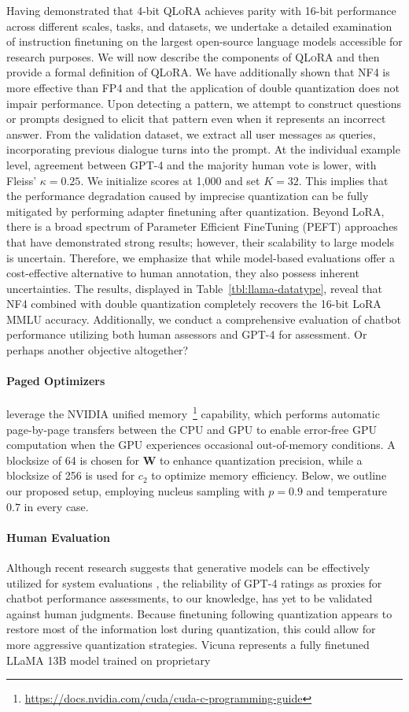 \label{sec:pushing}
Having demonstrated that 4-bit \textsc{QLoRA} achieves parity with 16-bit performance across different scales, tasks, and datasets, we undertake a detailed examination of instruction finetuning on the largest open-source language models accessible for research purposes. We will now describe the components of \textsc{QLoRA} and then provide a formal definition of \textsc{QLoRA}. We have additionally shown that NF4 is more effective than FP4 and that the application of double quantization does not impair performance. Upon detecting a pattern, we attempt to construct questions or prompts designed to elicit that pattern even when it represents an incorrect answer. From the validation dataset, we extract all user messages as queries, incorporating previous dialogue turns into the prompt. At the individual example level, agreement between GPT-4 and the majority human vote is lower, with Fleiss’ $\kappa=0.25$. We initialize scores at 1,000 and set $K=32$. This implies that the performance degradation caused by imprecise quantization can be fully mitigated by performing adapter finetuning after quantization. Beyond LoRA, there is a broad spectrum of Parameter Efficient FineTuning (PEFT) approaches that have demonstrated strong results; however, their scalability to large models is uncertain. Therefore, we emphasize that while model-based evaluations offer a cost-effective alternative to human annotation, they also possess inherent uncertainties. The results, displayed in Table~\ref{tbl:llama-datatype}, reveal that NF4 combined with double quantization completely recovers the 16-bit LoRA MMLU accuracy. Additionally, we conduct a comprehensive evaluation of chatbot performance utilizing both human assessors and GPT-4 for assessment. Or perhaps another objective altogether? \paragraph{Paged Optimizers} leverage the NVIDIA unified memory~\footnote{\tiny \url{https://docs.nvidia.com/cuda/cuda-c-programming-guide}} capability, which performs automatic page-by-page transfers between the CPU and GPU to enable error-free GPU computation when the GPU experiences occasional out-of-memory conditions. A blocksize of 64 is chosen for $\mathbf{W}$ to enhance quantization precision, while a blocksize of 256 is used for $c_2$ to optimize memory efficiency. Below, we outline our proposed setup, employing nucleus sampling with $p=0.9$ and temperature $0.7$ in every case. \paragraph{Human Evaluation} Although recent research suggests that generative models can be effectively utilized for system evaluations \citep{fu2023gptscore}, the reliability of GPT-4 ratings as proxies for chatbot performance assessments, to our knowledge, has yet to be validated against human judgments. Because finetuning following quantization appears to restore most of the information lost during quantization, this could allow for more aggressive quantization strategies. Vicuna represents a fully finetuned LLaMA 13B model trained on proprietary 